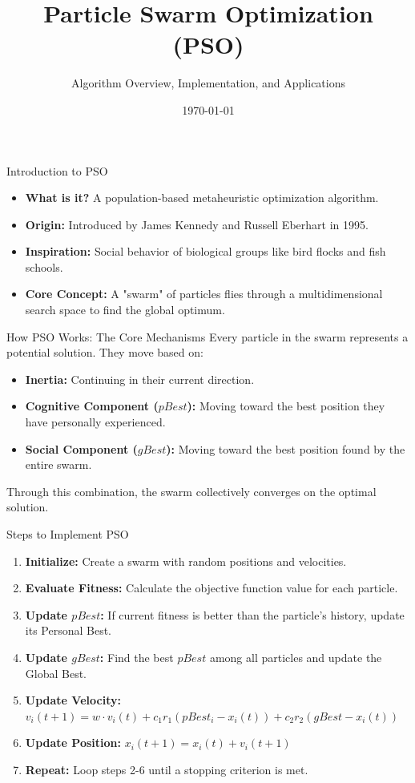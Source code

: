 \documentclass{beamer}
\title[Particle Swarm Optimization]{Particle Swarm Optimization (PSO)}
\subtitle{Algorithm Overview, Implementation, and Applications}
\author{}
\date{\today}
\begin{document}
\begin{frame}
    \titlepage
\end{frame}
\begin{frame}{Introduction to PSO}
    \begin{itemize}
        \item \textbf{What is it?} A population-based metaheuristic optimization algorithm.
        \item \textbf{Origin:} Introduced by James Kennedy and Russell Eberhart in 1995.
        \item \textbf{Inspiration:} Social behavior of biological groups like bird flocks and fish schools.
        \item \textbf{Core Concept:} A "swarm" of particles flies through a multidimensional search space to find the global optimum.
    \end{itemize}
\end{frame}
\begin{frame}{How PSO Works: The Core Mechanisms}
    Every particle in the swarm represents a potential solution. They move based on:
    \vspace{0.5cm}
    \begin{itemize}
        \item \textbf{Inertia:} Continuing in their current direction.
        \item \textbf{Cognitive Component ($pBest$):} Moving toward the best position they have personally experienced.
        \item \textbf{Social Component ($gBest$):} Moving toward the best position found by the entire swarm.
    \end{itemize}
    \vspace{0.5cm}
    Through this combination, the swarm collectively converges on the optimal solution.
\end{frame}
\begin{frame}{Steps to Implement PSO}
    \begin{enumerate}
        \item \textbf{Initialize:} Create a swarm with random positions and velocities.
        \item \textbf{Evaluate Fitness:} Calculate the objective function value for each particle.
        \item \textbf{Update $pBest$:} If current fitness is better than the particle's history, update its Personal Best.
        \item \textbf{Update $gBest$:} Find the best $pBest$ among all particles and update the Global Best.
        \item \textbf{Update Velocity:} \\
        $v_i(t+1) = w \cdot v_i(t) + c_1 r_1 (pBest_i - x_i(t)) + c_2 r_2 (gBest - x_i(t))$
        \item \textbf{Update Position:} $x_i(t+1) = x_i(t) + v_i(t+1)$
        \item \textbf{Repeat:} Loop steps 2-6 until a stopping criterion is met.
    \end{enumerate}
\end{frame}
\end{document}

